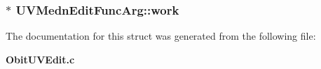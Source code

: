 \subsubsection{$\ast$ {\bf UVMedn\-Edit\-Func\-Arg::work}}\label{structUVMednEditFuncArg_o13}




The documentation for this struct was generated from the following file:\begin{CompactItemize}
\item 
{\bf Obit\-UVEdit.c}\end{CompactItemize}
